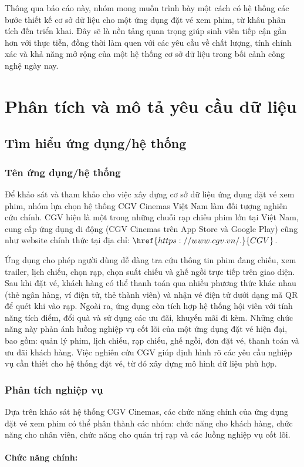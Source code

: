 \documentclass[a4paper]{article}
\newcommand{\cach}{\hspace*{1.5em}\ignorespaces}
\begin{document}
\vspace{0.2cm}

\indent Thông qua báo cáo này, nhóm mong muốn trình bày một cách có hệ thống các bước thiết kế cơ sở dữ liệu cho một ứng dụng đặt vé xem phim, từ khâu phân tích đến triển khai. Đây sẽ là nền tảng quan trọng giúp sinh viên tiếp cận gần hơn với thực tiễn, đồng thời làm quen với các yêu cầu về chất lượng, tính chính xác và khả năng mở rộng của một hệ thống cơ sở dữ liệu trong bối cảnh công nghệ ngày nay.  


\pagebreak
\section{Phân tích và mô tả yêu cầu dữ liệu}
\subsection{Tìm hiểu ứng dụng/hệ thống}
\subsubsection{Tên ứng dụng/hệ thống}
\cach Để khảo sát và tham khảo cho việc xây dựng cơ sở dữ liệu ứng dụng đặt vé xem phim, nhóm lựa chọn hệ thống CGV Cinemas Việt Nam làm đối tượng nghiên cứu chính. CGV hiện là một trong những chuỗi rạp chiếu phim lớn tại Việt Nam, cung cấp ứng dụng di động (CGV Cinemas trên App Store và Google Play) cũng như website chính thức tại địa chỉ: $\href{https://www.cgv.vn/.}{CGV}$.

\vspace{0.2cm}

\indent Ứng dụng cho phép người dùng dễ dàng tra cứu thông tin phim đang chiếu, xem trailer, lịch chiếu, chọn rạp, chọn suất chiếu và ghế ngồi trực tiếp trên giao diện. Sau khi đặt vé, khách hàng có thể thanh toán qua nhiều phương thức khác nhau (thẻ ngân hàng, ví điện tử, thẻ thành viên) và nhận vé điện tử dưới dạng mã QR để quét khi vào rạp. Ngoài ra, ứng dụng còn tích hợp hệ thống hội viên với tính năng tích điểm, đổi quà và sử dụng các ưu đãi, khuyến mãi đi kèm. Những chức năng này phản ánh luồng nghiệp vụ cốt lõi của một ứng dụng đặt vé hiện đại, bao gồm: quản lý phim, lịch chiếu, rạp chiếu, ghế ngồi, đơn đặt vé, thanh toán và ưu đãi khách hàng. Việc nghiên cứu CGV giúp định hình rõ các yêu cầu nghiệp vụ cần thiết cho hệ thống đặt vé, từ đó xây dựng mô hình dữ liệu phù hợp.
\subsubsection{Phân tích nghiệp vụ}
\cach Dựa trên khảo sát hệ thống CGV Cinemas, các chức năng chính của ứng dụng đặt vé xem phim có thể phân thành các nhóm: chức năng cho khách hàng, chức năng cho nhân viên, chức năng cho quản trị rạp và các luồng nghiệp vụ cốt lõi.
\\
\\
\cach \textbf{Chức năng chính:}
\end{document}
